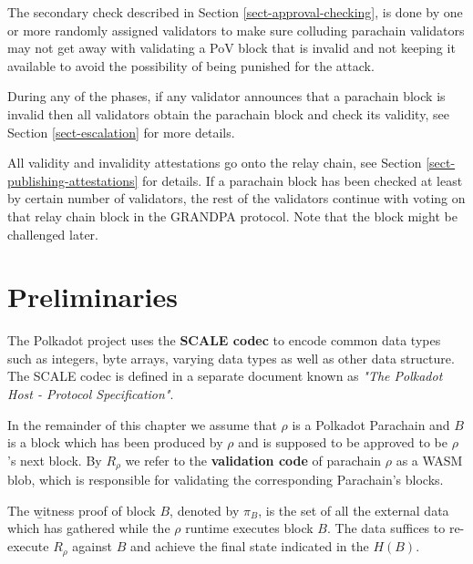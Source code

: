 The secondary check described in Section \ref{sect-approval-checking}, is done
by one or more randomly assigned validators to make sure colluding parachain
validators may not get away with validating a PoV block that is invalid and not
keeping it available to avoid the possibility of being punished for the attack.
\newline

During any of the phases, if any validator announces that a parachain block is
invalid then all validators obtain the parachain block and check its validity,
see Section \ref{sect-escalation} for more details.
\newline

All validity and invalidity attestations go onto the relay chain, see Section
\ref{sect-publishing-attestations} for details. If a parachain block has been
checked at least by certain number of validators, the rest of the validators
continue with voting on that relay chain block in the GRANDPA protocol. Note
that the block might be challenged later.
\newline

\section{Preliminaries}

\begin{definition}
  \label{defn-scale-codec}
  The Polkadot project uses the \textbf{SCALE codec} to encode common data types
  such as integers, byte arrays, varying data types as well as other data
  structure. The SCALE codec is defined in a separate document known as
  \textit{"The Polkadot Host - Protocol Specification"}.
\end{definition}

\begin{definition}
In the remainder of this chapter we assume that $\rho$ is a Polkadot Parachain
and $B$ is a block which has been produced by $\rho$ and is supposed to be
approved to be $\rho$'s next block. By $R_{\rho}$ we refer to the
\textbf{validation code} of parachain $\rho$ as a WASM blob, which is
responsible for validating the corresponding Parachain's blocks.
\end{definition}

\begin{definition}
  \label{defn-witness-proof}
  The {\b witness proof} of block $B$, denoted by {\bf $\pi_B$}, is the set of
  all the external data which has gathered while the $\rho$ runtime executes
  block $B$. The data suffices to re-execute $R_{\rho}$ against $B$ and achieve
  the final state indicated in the $H(B)$.
\end{definition}

